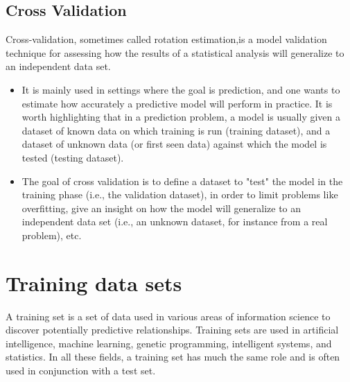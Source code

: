 \documentclass[]{report}
\begin{document}
\subsection{Cross Validation}

Cross-validation, sometimes called rotation estimation,is a model validation technique for assessing how the results of a statistical analysis will generalize to an independent data set.
\begin{itemize}
\item It is mainly used in settings where the goal is prediction, and one wants to estimate how accurately a predictive model will perform in practice. It is worth highlighting that in a prediction problem, a model is usually given a dataset of known data on which training is run (training dataset), and a dataset of unknown data (or first seen data) against which the model is tested (testing dataset).
\item The goal of cross validation is to define a dataset to "test" the model in the training phase (i.e., the validation dataset), in order to limit problems like overfitting, give an insight on how the model will generalize to an independent data set (i.e., an unknown dataset, for instance from a real problem), etc.
\end{itemize}



\section{Training data sets}

A training set is a set of data used in various areas of information science to discover potentially predictive relationships. Training sets are used in artificial intelligence, machine learning, genetic programming, intelligent systems, and statistics. In all these fields, a training set has much the same role and is often used in conjunction with a test set.
\end{document}
